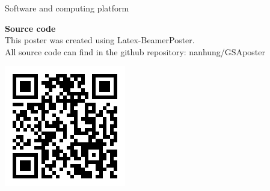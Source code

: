 \documentclass[xcolor=table]{beamer}
\begin{document}
\begin{frame}[t]
\begin{columns}[t]
\begin{column}{0.25\paperwidth}
\begin{alertblock}{Software and computing platform}
\vspace{10mm} %

\noindent\begin{minipage}{0.85\textwidth}%
\textbf{Source code}\\
\small{This poster was created using Latex-BeamerPoster.}\\
\small{All source code can find in the github repository: nanhung/GSAposter}\\
\end{minipage}%
\hfill%
\begin{minipage}{0.1\textwidth}
\includegraphics[width=1\linewidth]{QR}
\end{minipage}

\end{alertblock}

\end{column} %


\begin{column}{0.23\paperwidth} %


\end{column}
\end{columns}
\end{frame}
\end{document}
